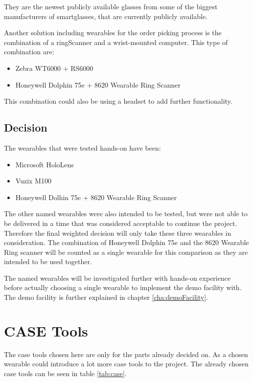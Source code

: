 They are the newest publicly available glasses from some of the biggest manufacturers of \gls{smartglasses}, that are currently publicly available.

Another solution including wearables for the order picking process is the combination of a \gls{ringScanner} and a wrist-mounted computer. This type of combination are:

\begin{itemize}
	\item Zebra WT6000 + RS6000
	\item Honeywell Dolphin 75e + 8620 Wearable Ring Scanner
\end{itemize}

This combination could also be using a headset to add further functionality.

\subsection{Decision}

The wearables that were tested hands-on have been:
\begin{itemize}
	\item Microsoft HoloLens
	\item Vuzix M100
	\item Honeywell Dolhin 75e + 8620 Wearable Ring Scanner
\end{itemize}

The other named wearables were also intended to be tested, but were not able to be delivered in a time that was considered acceptable to continue the project. Therefore the final weighted decision will only take these three wearables in consideration. The combination of Honeywell Dolphin 75e and the 8620 Wearable Ring scanner will be counted as a single wearable for this comparison as they are intended to be used together.  

 

The named wearables will be investigated further with hands-on experience before actually choosing a single wearable to implement the demo facility with. The demo facility is further explained in chapter \ref{cha:demoFacility}.

\cleardoublepage

\section{CASE Tools}\label{sec:caseTools}
The \gls{case} tools chosen here are only for the parts already decided on. As a chosen wearable could introduce a lot more \gls{case} tools to the project. The already chosen \gls{case} tools can be seen in table \ref{tab:case}.

